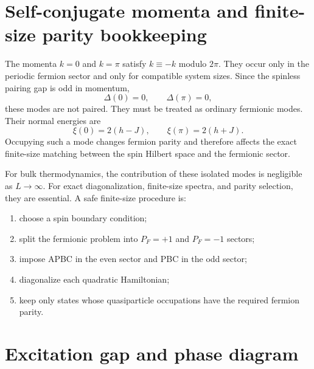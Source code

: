 \section{Self-conjugate momenta and finite-size parity bookkeeping}
\label{sec:xy-self-conjugate-momenta}

The momenta $k=0$ and $k=\pi$ satisfy $k\equiv-k$ modulo $2\pi$.  They occur only
in the periodic fermion sector and only for compatible system sizes.  Since the
spinless pairing gap is odd in momentum,
\begin{equation}
    \Delta(0)=0,
    \qquad
    \Delta(\pi)=0,
\end{equation}
these modes are not paired.  They must be treated as ordinary fermionic modes.
Their normal energies are
\begin{equation}
\label{eq:xy-mother-self-conjugate-xi}
    \xi(0)=2(h-J),
    \qquad
    \xi(\pi)=2(h+J).
\end{equation}
Occupying such a mode changes fermion parity and therefore affects the exact
finite-size matching between the spin Hilbert space and the fermionic sector.

For bulk thermodynamics, the contribution of these isolated modes is negligible
as $L\to\infty$.  For exact diagonalization, finite-size spectra, and parity
selection, they are essential.  A safe finite-size procedure is:
\begin{enumerate}[label=(\roman*)]
    \item choose a spin boundary condition;
    \item split the fermionic problem into $P_F=+1$ and $P_F=-1$ sectors;
    \item impose APBC in the even sector and PBC in the odd sector;
    \item diagonalize each quadratic Hamiltonian;
    \item keep only states whose quasiparticle occupations have the required
    fermion parity.
\end{enumerate}

\section{Excitation gap and phase diagram}
\label{sec:xy-phase-diagram}

